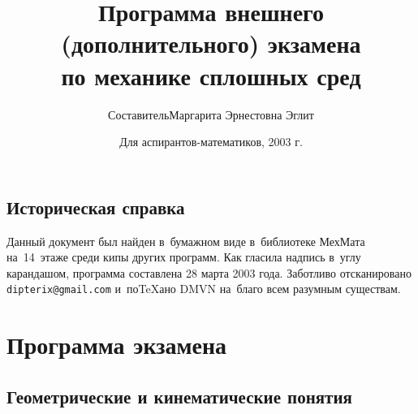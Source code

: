 \documentclass[a4paper,11pt]{article}
\title{Программа внешнего (дополнительного) экзамена\\по механике сплошных сред}
\author{Составитель\т Маргарита Эрнестовна Эглит}
\date{Для аспирантов-математиков, 2003 г.}
\begin{document}
\maketitle

\subsection*{Историческая справка}

Данный документ был найден в~бумажном виде в~библиотеке МехМата
на~14~этаже среди кипы других программ. Как гласила надпись в~углу карандашом,
программа составлена 28 марта 2003 года. Заботливо отсканировано
\texttt{dipterix@gmail.com} и~по\TeX ано DMVN на~благо всем разумным существам.
\medskip\dmvntrail

\section*{Программа экзамена}

\subsection*{Геометрические и кинематические понятия}
\end{document}
